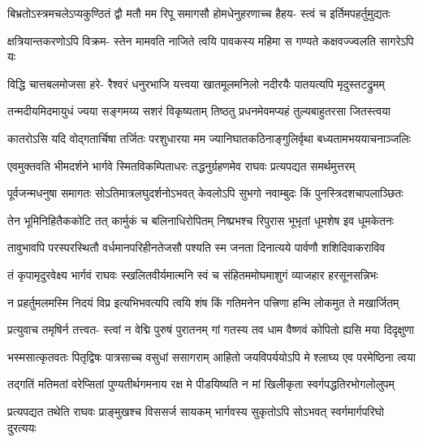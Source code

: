 \fourlineindentedshloka
{बिभ्रतोऽस्त्रमचलेऽप्यकुण्ठितं}
{द्वौ मतौ मम रिपू समागसौ}
{होमधेनुहरणाच्च हैहय-}
{स्त्वं च इर्तिमपहर्तुमुद्यतः} %

\fourlineindentedshloka
{क्षत्रियान्तकरणोऽपि विक्रम-}
{स्तेन मामवति नाजिते त्वयि}
{पावकस्य महिमा स गण्यते}
{कक्षवज्ज्वलति सागरेऽपि यः} %

\fourlineindentedshloka
{विद्धि चात्तबलमोजसा हरे-}
{रैश्वरं धनुरभाजि यत्त्वया}
{खातमूलमनिलो नदीरयैः}
{पातयत्यपि मृदुस्तटद्रुमम्} %

\fourlineindentedshloka
{तन्मदीयमिदमायुधं ज्यया}
{सङ्गमय्य सशरं विकृष्यताम्}
{तिष्ठतु प्रधनमेवमप्यहं}
{तुल्यबाहुतरसा जितस्त्वया} %

\fourlineindentedshloka
{कातरोऽसि यदि वोद्गतार्चिषा}
{तर्जितः परशुधारया मम}
{ज्यानिघातकठिनाङ्गुलिर्वृथा}
{बध्यतामभययाचनाञ्जलिः} %

\fourlineindentedshloka
{एवमुक्तवति भीमदर्शने}
{भार्गवे स्मितविकम्पिताधरः}
{तद्धनुर्ग्रहणमेव राघवः}
{प्रत्यपद्यत समर्थमुत्तरम्} %

\twolineshloka
{पूर्वजन्मधनुषा समागतः सोऽतिमात्रलघुदर्शनोऽभवत्}
{केवलोऽपि सुभगो नवाम्बुदः किं पुनस्त्रिदशचापलाञ्छितः} %

\fourlineindentedshloka
{तेन भूमिनिहितैककोटि तत्}
{कार्मुकं च बलिनाधिरोपितम्}
{निष्प्रभश्च रिपुरास भूभृतां}
{धूमशेष इव धूमकेतनः} %

\fourlineindentedshloka
{तावुभावपि परस्परस्थितौ}
{वर्धमानपरिहीनतेजसौ}
{पश्यति स्म जनता दिनात्यये}
{पार्वणौ शशिदिवाकराविव} %

\fourlineindentedshloka
{तं कृपामृदुरवेक्ष्य भार्गवं}
{राघवः स्खलितवीर्यमात्मनि}
{स्वं च संहितममोघमाशुगं}
{व्याजहार हरसूनसन्निभः} %

\fourlineindentedshloka
{न प्रहर्तुमलमस्मि निदयं}
{विप्र इत्यभिभवत्यपि त्वयि}
{शंष किं गतिमनेन पत्त्रिणा}
{हन्मि लोकमुत ते मखार्जितम्} %

\fourlineindentedshloka
{प्रत्युवाच तमृषिर्न तत्त्वत-}
{स्त्वां न वेद्मि पुरुषं पुरातनम्}
{गां गतस्य तव धाम वैष्णवं}
{कोपितो ह्यसि मया दिदृक्षुणा} %

\fourlineindentedshloka
{भस्मसात्कृतवतः पितृद्विषः}
{पात्रसाच्च वसुधां ससागराम्}
{आहितो जयविपर्ययोऽपि मे}
{श्लाघ्य एव परमेष्ठिना त्वया} %

\fourlineindentedshloka
{तद्गतिं मतिमतां वरेप्सितां}
{पुण्यतीर्थगमनाय रक्ष मे}
{पीडयिष्यति न मां खिलीकृता}
{स्वर्गपद्धतिरभोगलोलुपम्} %

\fourlineindentedshloka
{प्रत्यपद्यत तथेति राघवः}
{प्राङ्मुखश्च विससर्ज सायकम्}
{भार्गवस्य सुकृतोऽपि सोऽभवत्}
{स्वर्गमार्गपरिघो दुरत्ययः} %

